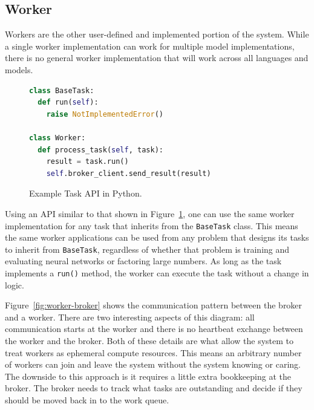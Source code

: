 \documentclass[conference]{IEEEtran}
\begin{document}
\subsection{Worker}
Workers are the other user-defined and implemented portion of the system. While
a single worker implementation can work for multiple model implementations,
there is no general worker implementation that will work across all languages
and models.

\begin{figure}
  \begin{lstlisting}[language=python]
class BaseTask:
  def run(self):
    raise NotImplementedError()

class Worker:
  def process_task(self, task):
    result = task.run()
    self.broker_client.send_result(result)
  \end{lstlisting}
  \caption{Example Task API in Python.}\label{fig:python-api}
\end{figure}

Using an API similar to that shown in Figure~\ref{fig:python-api}, one can use
the same worker implementation for any task that inherits from the
\texttt{BaseTask} class. This means the same worker applications can be used
from any problem that designs its tasks to inherit from \texttt{BaseTask},
regardless of whether that problem is training and evaluating neural networks
or factoring large numbers. As long as the task implements a \texttt{run()} method,
the worker can execute the task without a change in logic.

Figure~\ref{fig:worker-broker} shows the communication pattern between the
broker and a worker. There are two interesting aspects of this diagram: all
communication starts at the worker and there is no heartbeat exchange between
the worker and the broker. Both of these details are what allow the system to
treat workers as ephemeral compute resources. This means an arbitrary number of
workers can join and leave the system without the system knowing or caring. The
downside to this approach is it requires a little extra bookkeeping at the
broker. The broker needs to track what tasks are outstanding and decide if they
should be moved back in to the work queue.
\end{document}
